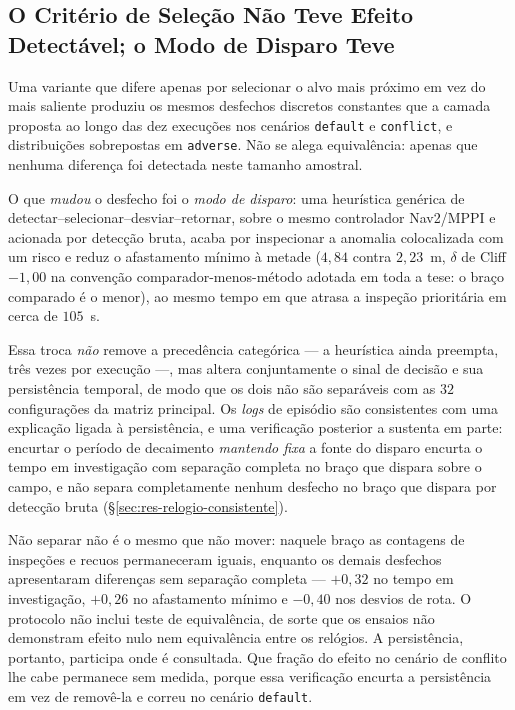 \subsection{O Critério de Seleção Não Teve Efeito Detectável; o Modo de Disparo Teve}

Uma variante que difere apenas por selecionar o alvo mais próximo em vez do mais
saliente produziu os mesmos desfechos discretos constantes que a camada proposta ao
longo das dez execuções nos cenários \texttt{default} e \texttt{conflict}, e
distribuições sobrepostas em \texttt{adverse}. Não se alega equivalência: apenas
que nenhuma diferença foi detectada neste tamanho amostral.

O que \emph{mudou} o desfecho foi o \emph{modo de disparo}: uma heurística genérica
de detectar--selecionar--desviar--retornar, sobre o mesmo controlador Nav2/MPPI e
acionada por detecção bruta, acaba por inspecionar a anomalia colocalizada com um
risco e reduz o afastamento mínimo à metade ($4{,}84$ contra $2{,}23$~m, $\delta$ de
Cliff $-1{,}00$ na convenção comparador-menos-método adotada em toda a tese: o braço
comparado é o menor), ao mesmo tempo em que atrasa a inspeção prioritária em cerca de
$105$~s.

Essa troca \emph{não} remove a precedência categórica --- a heurística ainda
preempta, três vezes por execução ---, mas altera conjuntamente o sinal de decisão e
sua persistência temporal, de modo que os dois não são separáveis com as $32$
configurações da matriz principal. Os \textit{logs} de episódio são consistentes com
uma explicação ligada à persistência, e uma verificação posterior a sustenta em parte:
encurtar o período de decaimento \emph{mantendo fixa} a fonte do disparo encurta o
tempo em investigação com separação completa no braço que dispara sobre o campo, e não
separa completamente nenhum desfecho no braço que dispara por detecção bruta
(§\ref{sec:res-relogio-consistente}).

Não separar não é o mesmo que não mover: naquele braço as contagens de inspeções e
recuos permaneceram iguais, enquanto os demais desfechos apresentaram diferenças sem
separação completa --- $+0{,}32$ no tempo em investigação, $+0{,}26$ no afastamento
mínimo e $-0{,}40$ nos desvios de rota. O protocolo não inclui teste de equivalência,
de sorte que os ensaios não demonstram efeito nulo nem equivalência entre os relógios.
A persistência, portanto, participa onde é consultada. Que fração do efeito no cenário de conflito lhe cabe permanece sem medida,
porque essa verificação encurta a persistência em vez de removê-la e correu no cenário
\texttt{default}.

